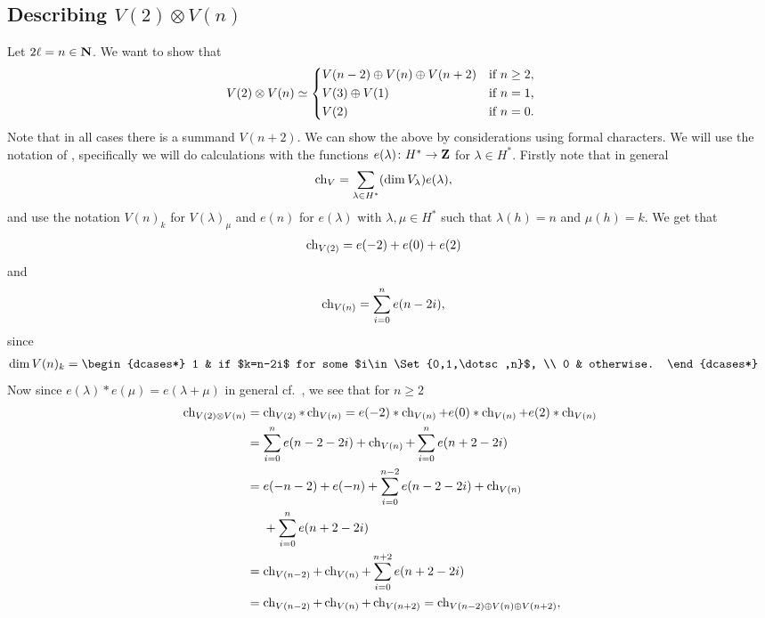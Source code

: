 \subsection{\texorpdfstring{Describing $V(2)\otimes V(n)$}{Describing V(2) tensor product V(n)}}
Let $2\ell=n\in\mathbf{N}$. We want to show that
\begin{align}\label{eq:V(2)tensorV(n)}
  V(2)\otimes V(n) &\simeq
                     \begin{dcases*}
                       V(n-2) \oplus V(n) \oplus V(n+2) & if $n\geq 2$,\\
                       V(3)\oplus V(1) & if $n=1$, \\
                       V(2) & if $n=0$.
                     \end{dcases*}
\end{align}
Note that in all cases there is a summand $V(n+2)$. We can show the above by considerations using formal characters. We will use the notation of \cite[Chapter~8]{jantzen}, specifically we will do calculations with the functions $e(\lambda)\colon H^*\to \mathbf{Z}$ for $\lambda\in H^*$. Firstly note that in general
\begin{align*}
  \operatorname{ch}_V &= \sum_{\lambda\in H^*} (\dim V_\lambda) e(\lambda),
\end{align*}
and use the notation $V(n)_k$ for $V(\lambda)_\mu$ and $e(n)$ for $e(\lambda)$ with $\lambda,\mu\in H^*$ such that $\lambda(h)=n$ and $\mu(h)=k$. We get that
\begin{align*}
  \operatorname{ch}_{V(2)} &= e(-2) + e(0) + e(2)
\end{align*}
and 
\begin{align*}
  \operatorname{ch}_{V(n)} &= \sum_{i=0}^n e(n-2i),
\end{align*}
since
\begin{align*}
  \dim V(n)_k &=
                \begin{dcases*}
                  1 & if $k=n-2i$ for some $i\in\Set{0,1,\dotsc,n}$, \\
                  0 & otherwise.
                \end{dcases*}
\end{align*}
Now since $e(\lambda)*e(\mu)=e(\lambda+\mu)$ in general cf.\ \cite[93]{jantzen}, we see that for $n\geq 2$
\begin{align*}
  \ch_{V(2)\otimes V(n)} &= \ch_{V(2)} * \ch_{V(n)} = e(-2)*\ch_{V(n)} + e(0)*\ch_{V(n)} + e(2)*\ch_{V(n)} \\
                         &= \sum_{i=0}^n e(n-2-2i) + \ch_{V(n)} + \sum_{i=0}^n e(n+2-2i) \\
                         &= e(-n-2)+e(-n) + \sum_{i=0}^{n-2} e(n-2-2i) + \ch_{V(n)} \\*
                         &\phantom{{}={}}+ \sum_{i=0}^n e(n+2-2i) \\
                         &= \ch_{V(n-2)} + \ch_{V(n)} + \sum_{i=0}^{n+2} e(n+2-2i) \\
  &= \ch_{V(n-2)} + \ch_{V(n)} + \ch_{V(n+2)} = \ch_{V(n-2)\oplus V(n)\oplus V(n+2)},
\end{align*}
